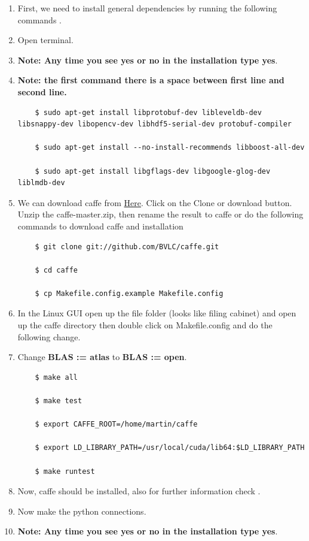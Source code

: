\documentclass[12pt]{article}
\begin{document}
\begin{enumerate}
  \item First, we need to install general dependencies by running the following commands \cite{CAFFE}.
  \item Open terminal.
  \item \textbf{Note: Any time you see yes or no in the installation type yes}.
  \item \textbf{Note: the first command there is a space between first line and second line.}

\begin{lstlisting}
    $ sudo apt-get install libprotobuf-dev libleveldb-dev libsnappy-dev libopencv-dev libhdf5-serial-dev protobuf-compiler

    $ sudo apt-get install --no-install-recommends libboost-all-dev

    $ sudo apt-get install libgflags-dev libgoogle-glog-dev liblmdb-dev
\end{lstlisting}


  \item We can download caffe from  \href{https://github.com/BVLC/caffe}{Here}. Click on the Clone or download button. Unzip the caffe-master.zip, then rename the result to caffe or do the following commands to download caffe and installation


\begin{lstlisting}
    $ git clone git://github.com/BVLC/caffe.git

    $ cd caffe

    $ cp Makefile.config.example Makefile.config
\end{lstlisting}

  \item In the Linux GUI open up the file folder (looks like filing cabinet) and open up the caffe directory then double click on Makefile.config and do the following change.
  \item Change \textbf{BLAS := atlas} to \textbf{BLAS := open}.

\begin{lstlisting}
    $ make all

    $ make test

    $ export CAFFE_ROOT=/home/martin/caffe

    $ export LD_LIBRARY_PATH=/usr/local/cuda/lib64:$LD_LIBRARY_PATH

    $ make runtest
\end{lstlisting}

  \item Now, caffe should be installed, also for further information check \cite{caffe_further}.
  \item Now make the python connections.
  \item \textbf{Note: Any time you see yes or no in the installation type yes}.
\end{enumerate}
\end{document}
